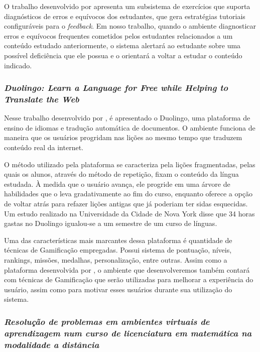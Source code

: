 O trabalho desenvolvido por  apresenta um subsistema de exerc\'icios que suporta diagn\'osticos de erros e equ\'ivocos dos estudantes, que 
gera estrat\'egias tutoriais configur\'aveis para o \textit{feedback}. Em nosso trabalho, quando o ambiente diagnosticar erros e equ\'ivocos frequentes cometidos pelos estudantes relacionados a 
um conte\'udo estudado anteriormente, o sistema alertar\'a ao estudante sobre uma poss\'ivel defici\^encia que ele possua e o orientar\'a a voltar a estudar o conte\'udo indicado.


\subsubsection{\textit{Duolingo: Learn a Language for Free while Helping to Translate the Web}}\label{trabalho_relacionados_duolingo}

Nesse trabalho desenvolvido por , \'e apresentado o Duolingo, uma plataforma de ensino de idiomas e tradu\c{c}\~ao autom\'atica de documentos. O ambiente funciona de 
maneira que os usuários progridam nas lições ao mesmo tempo que traduzem conteúdo real da internet. 

O método utilizado pela plataforma se caracteriza pela li\c{c}\~oes fragmentadas, pelas quais os 
alunos, atrav\'es do m\'etodo de repeti\c{c}\~ao, fixam o conte\'udo da língua estudada. \`A medida que o usu\'ario avan\c{c}a, ele progride em uma \'arvore de habilidades que o leva gradativamente 
ao fim do curso, enquanto oferece a op\c{c}\~ao de voltar atr\'as para refazer li\c{c}\~oes antigas que j\'a poderiam ter sidas esquecidas. Um estudo realizado na Universidade da Cidade de Nova York 
\cite{vesselinov2012duolingo} disse que 34 horas gastas no Duolingo igualou-se a um semestre de um curso de l\'inguas.

Uma das características mais marcantes dessa plataforma \'e quantidade de técnicas de Gamifica\c{c}\~ao empregadas. Possui sistema de pontua\c{c}\~ao, n\'iveis, rankings, miss\~oes, medalhas, 
personaliza\c{c}\~ao, entre outras. Assim como a plataforma desenvolvida por , o ambiente que desenvolveremos tamb\'em contar\'a com t\'ecnicas de Gamifica\c{c}\~ao que 
ser\~ao utilizadas para melhorar a experi\^encia do usu\'ario, assim como para motivar esses usu\'arios durante sua utiliza\c{c}\~ao do sistema.

\subsubsection{\textit{Resolução de problemas em ambientes virtuais de aprendizagem num curso de licenciatura em matemática na modalidade a distância}}

